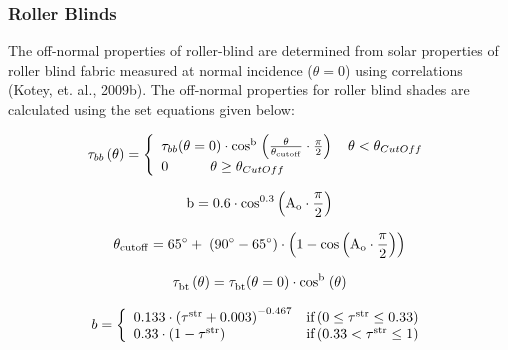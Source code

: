 {\subsubsection{Roller Blinds}\label{roller-blinds}

The off-normal properties of roller-blind are determined from solar properties of roller blind fabric measured at normal incidence ($\theta = 0$) using correlations (Kotey, et. al., 2009b). The off-normal properties for roller blind shades are calculated using the set equations given below:

\begin{equation}
{{\rm{\tau }}_{bb}}\left( {\rm{\theta }} \right) = \left\{ \begin{array}{l}{{\rm{\tau }}_{bb}}{\rm{(\theta }} = {\rm{0)}} \cdot {\rm{co}}{{\rm{s}}^{\rm{b}}}{\kern 1pt} \left( {\frac{{\rm{\theta }}}{{{{\rm{\theta }}_{{\rm{cutoff}}}}}} \cdot \frac{\pi }{2}} \right)\quad \theta  < {\theta_{CutOff}}\\0\quad \quad \quad \theta  \ge {\theta_{CutOff}}\end{array} \right.
\end{equation}

\begin{equation}
{\rm{b}} = {\rm{0}}{\rm{.6}} \cdot {\rm{co}}{{\rm{s}}^{{\rm{0}}{\rm{.3}}}}\left( {{{\rm{A}}_{\rm{o}}} \cdot \frac{{\rm{\pi }}}{{\rm{2}}}} \right)
\end{equation}

\begin{equation}
{{\rm{\theta }}_{{\rm{cutoff}}}} = {\rm{65}}^\circ  + \;\left( {{\rm{90}}^\circ  - {\rm{65}}^\circ } \right) \cdot \left( {{\rm{1}} - {\rm{cos}}\left( {{{\rm{A}}_{\rm{o}}} \cdot \frac{{\rm{\pi }}}{{\rm{2}}}} \right)} \right)
\end{equation}

\begin{equation}
{\rm{\tau }}_{{\rm{bt}}}^{}\left( {\rm{\theta }} \right) = {\rm{\tau }}_{{\rm{bt}}}^{}{\rm{(\theta }} = {\rm{0)}} \cdot {\rm{co}}{{\rm{s}}^{\rm{b}}}{\kern 1pt} \left( {\rm{\theta }} \right)
\end{equation}

\begin{equation}
b = \left\{ 
    \begin{array}{lc}
      0.133 \cdot \left( \rm{\tau}^{str} + 0.003 \right)^{-0.467} &\text{if} \left( 0 \le \rm{\tau}^{str} \le 0.33 \right) \\
      0.33 \cdot \left( 1 - \rm{\tau}^{str} \right)               &\text{if} \left( 0.33 < \rm{\tau}^{str} \le 1 \right)
    \end{array}
  \right.
\end{equation}

}
